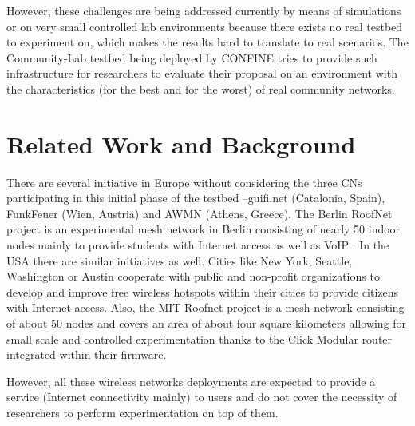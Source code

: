 \documentclass[conference]{IEEEtran}
\begin{document}

However, these challenges are being addressed currently by means of simulations 
or on very small controlled lab environments because there exists no real testbed
to experiment on, which makes the results hard to translate to real scenarios. The Community-Lab testbed
being deployed by CONFINE tries to provide such infrastructure for researchers to evaluate
their proposal on an environment with the characteristics (for the best and for the worst)
of real community networks.

\section{Related Work and Background}


There are several initiative in Europe without considering the three CNs participating in this initial
phase of the testbed --guifi.net (Catalonia, Spain), FunkFeuer (Wien, Austria) and AWMN (Athens, Greece). The Berlin RoofNet project is an
experimental mesh network in Berlin consisting of nearly 50 indoor nodes mainly to provide
students with Internet access as well as VoIP \cite{berlin-roofnet}. In the USA there are similar initiatives as well. Cities like New York, Seattle, Washington or Austin cooperate with
public and non-profit organizations to develop and improve free wireless hotspots within 
their cities to provide citizens with Internet access. Also, the MIT Roofnet \cite{mit-roofnet} project
is a mesh network consisting of about 50 nodes and covers an area of about four square
kilometers allowing for small scale and controlled experimentation thanks to the
Click Modular router integrated within their firmware. 

However, all these wireless networks deployments 
are expected to provide a service (Internet connectivity mainly) to users and do not
cover the necessity of researchers to perform experimentation on top of them.

\end{document}
